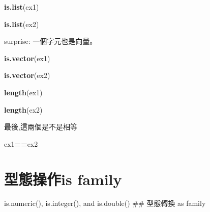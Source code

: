\documentclass[]{book}
\newenvironment{Shaded}{\begin{snugshade}}{\end{snugshade}}
\newcommand{\KeywordTok}[1]{\textcolor[rgb]{0.13,0.29,0.53}{\textbf{#1}}}
\newcommand{\NormalTok}[1]{#1}
\newcommand{\OperatorTok}[1]{\textcolor[rgb]{0.81,0.36,0.00}{\textbf{#1}}}
\theoremstyle{definition}
\theoremstyle{definition}
\theoremstyle{definition}
\theoremstyle{remark}
\begin{document}
\begin{Shaded}
\begin{Highlighting}[]
\KeywordTok{is.list}\NormalTok{(ex1)}
\end{Highlighting}
\end{Shaded}

\begin{Shaded}
\begin{Highlighting}[]
\KeywordTok{is.list}\NormalTok{(ex2)}
\end{Highlighting}
\end{Shaded}

surprise: 一個字元也是向量。

\begin{Shaded}
\begin{Highlighting}[]
\KeywordTok{is.vector}\NormalTok{(ex1)}
\end{Highlighting}
\end{Shaded}

\begin{Shaded}
\begin{Highlighting}[]
\KeywordTok{is.vector}\NormalTok{(ex2)}
\end{Highlighting}
\end{Shaded}

\begin{Shaded}
\begin{Highlighting}[]
\KeywordTok{length}\NormalTok{(ex1)}
\end{Highlighting}
\end{Shaded}

\begin{Shaded}
\begin{Highlighting}[]
\KeywordTok{length}\NormalTok{(ex2)}
\end{Highlighting}
\end{Shaded}

最後,這兩個是不是相等

\begin{Shaded}
\begin{Highlighting}[]
\NormalTok{ex1}\OperatorTok{==}\NormalTok{ex2}
\end{Highlighting}
\end{Shaded}

\hypertarget{is-family}{%
\section{型態操作is family}\label{is-family}}

is.numeric(), is.integer(), and is.double() \#\# 型態轉換 as family
\end{document}
